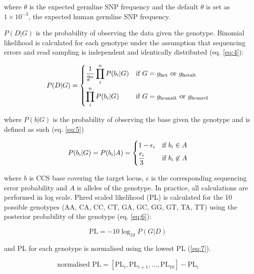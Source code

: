 where $\theta$ is the expected germline SNP frequency and the default $\theta$ is set as $1\times10^{-3}$, the expected human germline SNP frequency. 

$P(D|G)$ is the probability of observing the data given the genotype. Binomial likelihood is calculated for each genotype under the assumption that sequencing errors and read sampling is independent and identically distributed (eq. \ref{eq:4}):

\begin{equation} \label{eq:4}
P(D|G) =  
	\begin{dcases}
    	\frac{1}{2^n}\prod_{i}^{n} P(b_{i}|G) & \text{if } G = g_{\text{het}} \text{ or } g_{\text{hetalt}} \\
	    \prod_{i}^{n} P(b_{i}|G) & \text{if } G = g_{\text{homalt}} \text{ or } g_{\text{homref}} \\
	\end{dcases}
\end{equation}

where $P(b|G)$ is the probability of observing the base given the genotype and is defined as such (eq. \ref{eq:5})

\begin{equation} \label{eq:5}
P(b_{i}|G) = P(b_{i}|A) = 
	\begin{dcases}
    	1 - \epsilon_{i} & \text{if } b_{i} \in A \\
	    \frac{\epsilon_{i}}{3} & \text{if } b_{i} \not\in A \\
	\end{dcases} \smallskip
\end{equation}

where $b$ is CCS base covering the target locus, $\epsilon$ is the corresponding sequencing error probability and $A$ is alleles of the genotype. In practice, all calculations are performed in log scale. Phred scaled likelihood (PL) is calculated for the 10 possible genotypes (AA, CA, CC, CT, GA, GC, GG, GT, TA, TT) using the posterior probability of the genotype (eq. \ref{eq:6}):

\begin{equation} \label{eq:6}
\text{PL} = -10\log_{10}P(G|D) 
\end{equation}

and PL for each genotype is normalised using the lowest PL (\ref{eq:7}).

\begin{equation} \label{eq:7}
\text{normalised PL} = [\text{PL}_{i}, \text{PL}_{i+1}, \ldots, \text{PL}_{10}] - \text{PL}_{i}
\end{equation}

